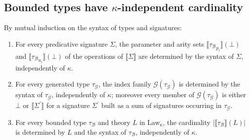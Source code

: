 \documentclass[acmsmall, screen, review, anonymous]{acmart}
\theoremstyle{definition}
\newcommand{\initial}{\bot}
\newcommand{\lawc}{\mathrm{Law_{\kappa}}}
\newcommand{\sem}[1]{\llbracket #1 \rrbracket}
\newcommand{\taug}{{\tau_{\mathcal{G}}}}
\newcommand{\taub}{{\tau_{\mathcal{B}}}}
\begin{document}
\subsection{Bounded types have $\kappa$-independent cardinality}

\begin{lemma}
\label{lemma:bounded-size}
  By mutual induction on the syntax of types and signatures:
  \begin{enumerate}
  \item For every predicative signature $\Sigma$, the parameter and
    arity sets $\sem{{\taub}_{p_i}}(\initial)$ and
    $\sem{{\taub}_{a_i}}(\initial)$ of the operations of $\sem{\Sigma}$
    are determined by the syntax of $\Sigma$, independently of
    $\kappa$.
  \item For every generated type $\taug$, the index family
    $\mathcal{G}(\taug)$ is determined by the syntax of $\taug$,
    independently of $\kappa$; moreover every member of
    $\mathcal{G}(\taug)$ is either $\initial$ or $\sem{\Sigma^\prime}$
    for a signature $\Sigma^\prime$ built as a sum of signatures
    occurring in $\taug$.
  \item For every bounded type $\taub$ and theory $L$ in $\lawc$, the
    cardinality $|\sem{\taub}(L)|$ is determined by $L$ and the syntax
    of $\taub$, independently of $\kappa$.
  \end{enumerate}
\end{lemma}
\end{document}
